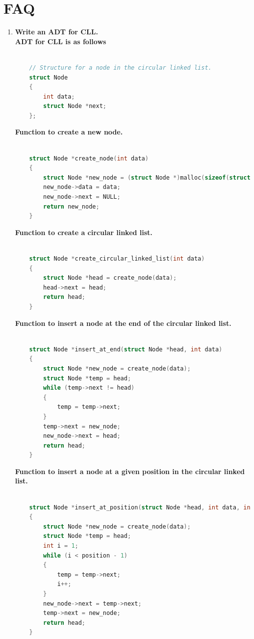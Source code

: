 \documentclass[11pt]{article}
\begin{document}
\section{FAQ}

\begin{enumerate}
	\item \textbf{Write an ADT for CLL.}\\

	      \textbf {ADT for CLL is as follows}\\

	      \begin{lstlisting}[language=C]

	// Structure for a node in the circular linked list.
	struct Node
	{
		int data;
		struct Node *next;
	};
	\end{lstlisting}
	      \textbf{Function to create a new node.}
	      \begin{lstlisting}[language=C]

	struct Node *create_node(int data)
	{
		struct Node *new_node = (struct Node *)malloc(sizeof(struct Node));
		new_node->data = data;
		new_node->next = NULL;
		return new_node;
	}
	\end{lstlisting}

	      \textbf{Function to create a circular linked list.}
	      \begin{lstlisting}[language=C]
	
	struct Node *create_circular_linked_list(int data)
	{
		struct Node *head = create_node(data);
		head->next = head;
		return head;
	}

	\end{lstlisting}

	      \textbf{Function to insert a node at the end of the circular linked list.}
	      \begin{lstlisting}[language=C]
	
	struct Node *insert_at_end(struct Node *head, int data)
	{
		struct Node *new_node = create_node(data);
		struct Node *temp = head;
		while (temp->next != head)
		{
			temp = temp->next;
		}
		temp->next = new_node;
		new_node->next = head;
		return head;
	}

		\end{lstlisting}

	      \textbf{Function to insert a node at a given position in the circular linked list.}
	      \begin{lstlisting}[language=C]
	
	struct Node *insert_at_position(struct Node *head, int data, int position)
	{
		struct Node *new_node = create_node(data);
		struct Node *temp = head;
		int i = 1;
		while (i < position - 1)
		{
			temp = temp->next;
			i++;
		}
		new_node->next = temp->next;
		temp->next = new_node;
		return head;
	}
	\end{lstlisting}


\end{enumerate}
\end{document}
